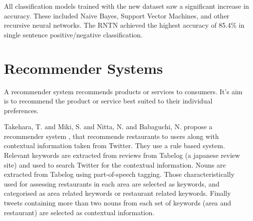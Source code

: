 All classification models trained with the new dataset saw a significant increase in accuracy. These included Naive Bayes, Support Vector Machines, and other recursive neural networks. The RNTN achieved the highest accuracy of 85.4\% in single sentence positive/negative classification.

\section{Recommender Systems}

A recommender system recommends products or services to consumers. It's aim is to recommend the product or service best suited to their individual preferences.

Takehara, T. and Miki, S. and Nitta, N. and Babaguchi, N. propose a recommender system \cite{takeharaContext2012}, that recommends restaurants to users along with contextual information taken from Twitter. They use a rule based system. Relevant keywords are extracted from reviews from Tabelog (a japanese review site) and used to search Twitter for the contextual information. Nouns are extracted from Tabelog using part-of-speech tagging. Those characteristically used for assessing restaurants in each area are selected as keywords, and categorised as area related keywords or restaurant related keywords. Finally tweets containing more than two nouns from each set of keywords (area and restaurant) are selected as contextual information.
